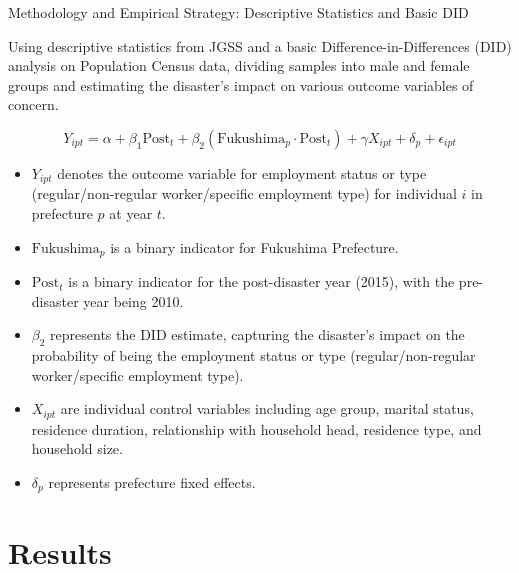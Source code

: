 \documentclass[serif, aspectratio=169]{beamer}
\begin{document}

\begin{frame}{Methodology and Empirical Strategy: Descriptive Statistics and Basic DID}

\vspace{-0.2cm}

 Using descriptive statistics from JGSS and a basic Difference-in-Differences (DID) analysis on Population Census data, dividing samples into male and female groups and estimating the disaster's impact on various outcome variables of concern.

\vspace{-0.1cm}

    \begin{equation}
    Y_{ipt} = \alpha + \beta_1 \text{Post}_t + \beta_2 (\text{Fukushima}_p \cdot \text{Post}_t) + \gamma X_{ipt} + \delta_p + \epsilon_{ipt}
    \end{equation}


    \begin{itemize}
    \item $Y_{ipt}$ denotes the outcome variable for employment status or type (regular/non-regular worker/specific employment type) for individual $i$ in prefecture $p$ at year $t$.
    \item $\text{Fukushima}_p$ is a binary indicator for Fukushima Prefecture.
    \item $\text{Post}_t$ is a binary indicator for the post-disaster year (2015), with the pre-disaster year being 2010.
    \item $\beta_2$ represents the DID estimate, capturing the disaster's impact on the probability of being the employment status or type (regular/non-regular worker/specific employment type).
    \item $X_{ipt}$ are individual control variables including age group, marital status, residence duration, relationship with household head, residence type, and household size.
    \item $\delta_p$ represents prefecture fixed effects.
    \end{itemize}
\end{frame}

\section{Results}
\end{document}
